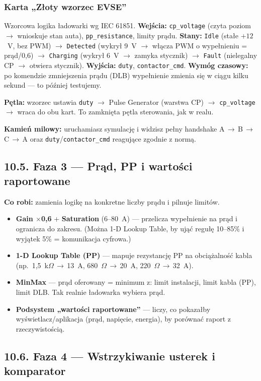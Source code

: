 \documentclass[11pt]{article}
\newcommand{\ra}{$\rightarrow$}
\newcommand{\key}[1]{\textbf{\color{navy}#1}}
\begin{document}
\subsubsection{Karta „Złoty wzorzec EVSE''}
Wzorcowa logika ładowarki wg IEC 61851. \key{Wejścia:} \texttt{cp\_voltage} (czyta poziom \ra{} wnioskuje stan auta), \texttt{pp\_resistance}, limity prądu. \key{Stany:} \texttt{Idle} (stałe $+12$~V, bez PWM) \ra{} \texttt{Detected} (wykrył 9~V \ra{} włącza PWM o wypełnieniu = prąd/0,6) \ra{} \texttt{Charging} (wykrył 6~V \ra{} zamyka stycznik) \ra{} \texttt{Fault} (nielegalny CP \ra{} otwiera stycznik). \key{Wyjścia:} \texttt{duty}, \texttt{contactor\_cmd}. \key{Wymóg czasowy:} po komendzie zmniejszenia prądu (DLB) wypełnienie zmienia się w ciągu kilku sekund --- to później testujemy.

\key{Pętla:} wzorzec ustawia \texttt{duty} \ra{} Pulse Generator (warstwa CP) \ra{} \texttt{cp\_voltage} \ra{} wraca do obu kart. To zamknięta pętla sterowania, jak w realu.

\key{Kamień milowy:} uruchamiasz symulację i widzisz pełny handshake A\,\ra\,B\,\ra\,C\,\ra\,A oraz \texttt{duty}/\texttt{contactor\_cmd} reagujące zgodnie z normą.

\subsection{10.5. Faza 3 --- Prąd, PP i wartości raportowane}

\key{Co robi:} zamienia logikę na konkretne liczby prądu i pilnuje limitów.
\begin{itemize}
  \item \key{Gain $\times$0,6} + \key{Saturation} (6--80~A) --- przelicza wypełnienie na prąd i ogranicza do zakresu. (Można 1-D Lookup Table, by ująć regułę 10--85\% i wyjątek 5\% = komunikacja cyfrowa.)
  \item \key{1-D Lookup Table (PP)} --- mapuje rezystancję PP na obciążalność kabla (np.\ 1,5~k$\Omega$\,\ra\,13~A, 680~$\Omega$\,\ra\,20~A, 220~$\Omega$\,\ra\,32~A).
  \item \key{MinMax} --- prąd oferowany = minimum z: limit instalacji, limit kabla (PP), limit DLB. Tak realnie ładowarka wybiera prąd.
  \item \key{Podsystem „wartości raportowane''} --- liczy, co pokazałby wyświetlacz/aplikacja (prąd, napięcie, energia), by porównać raport z rzeczywistością.
\end{itemize}

\subsection{10.6. Faza 4 --- Wstrzykiwanie usterek i komparator}
\end{document}
